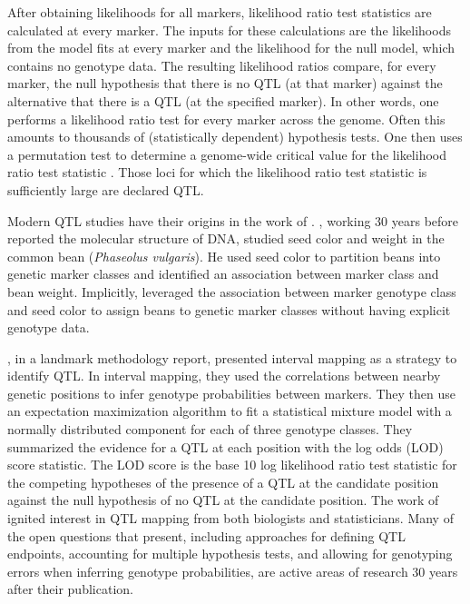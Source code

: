 \documentclass[]{article}\usepackage[]{graphicx}\usepackage[]{color}
\begin{document}
After obtaining likelihoods for all markers, likelihood ratio test statistics are calculated
at every marker. The inputs for these calculations are the likelihoods from the model fits at
every marker and the likelihood for the null model, which contains no genotype data.
The resulting likelihood ratios compare, for every marker, the null hypothesis that there is no 
QTL (at that marker) against the alternative that there is a QTL (at the specified marker).
In other words, one performs a likelihood ratio test for every marker across the genome.
Often this amounts to thousands of (statistically dependent) hypothesis tests.
One then uses a permutation test to determine a genome-wide critical value
for the likelihood ratio test statistic \citep{churchill1994empirical}.
Those loci for which the likelihood ratio test statistic is sufficiently large are declared QTL. 


Modern QTL studies have their origins in the work of \citet{sax1923association}.
\citet{sax1923association}, working 30 years before \citet{watson1953molecular} reported
the molecular structure of DNA, studied seed color and weight in the common bean
(\emph{Phaseolus vulgaris}). He used seed color to partition beans into genetic
marker classes and identified an association between marker class and bean weight. Implicitly, \citet{sax1923association} leveraged the association between marker genotype class and seed color to assign beans to genetic marker classes without having explicit genotype data.



\citet{lander1989mapping}, in a landmark methodology report, presented
interval mapping as a strategy to identify QTL. 
In interval mapping, they used the correlations between nearby genetic positions
to infer genotype probabilities between markers.
They then use an expectation maximization algorithm \citep{dempster1977maximum, lander1987construction}
to fit a statistical mixture model with a normally distributed component for each of three genotype classes. 
They summarized the evidence for a QTL at each position with the log odds (LOD) score statistic.
The LOD score is the base 10 log likelihood ratio test statistic for
the competing hypotheses of the presence of a QTL at the candidate position
against the null hypothesis of no QTL at the candidate position.
The work of \citet{lander1989mapping} ignited interest in QTL mapping from
both biologists and statisticians.
Many of the open questions that \citet{lander1989mapping} present, including approaches
for defining QTL endpoints, accounting for multiple hypothesis tests, and
allowing for genotyping errors when inferring genotype probabilities,
are active areas of research 30 years after their publication.
\end{document}
